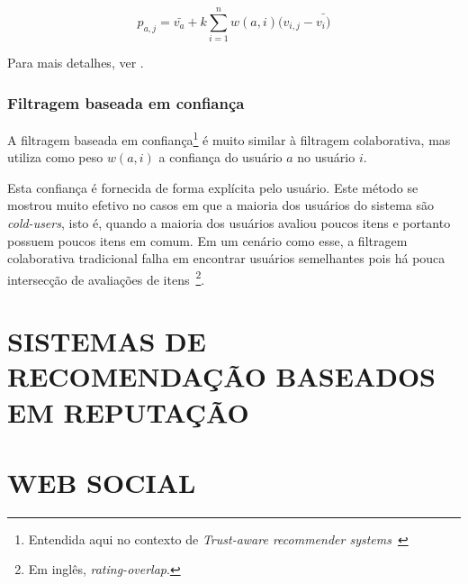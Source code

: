\begin{equation}
 p_{a,j} = \bar{v_{a}} + k\sum_{i=1}^n{w(a,i) (v_{i,j} - \bar{v_{i})}}
 \label{eq:filtragem_colaborativa_geral} 
\end{equation}

Para mais detalhes, ver \cite{Breese98}.


\subsubsection{Filtragem baseada em confiança} %

A filtragem baseada em confiança\footnote{Entendida aqui no contexto de \textit{Trust-aware recommender systems}~\cite{Massa07}} é muito similar à filtragem colaborativa, mas utiliza como peso $w(a,i)$ a confiança do usuário $a$ no usuário $i$.

Esta confiança é fornecida de forma explícita pelo usuário. Este método se mostrou muito efetivo no casos em que a maioria dos usuários do sistema são \textit{cold-users}, isto é, quando a maioria dos usuários avaliou poucos itens e portanto possuem poucos itens em comum. Em um cenário como esse, a filtragem colaborativa tradicional falha em encontrar usuários semelhantes pois há pouca intersecção de avaliações de itens~\footnote{Em inglês, \textit{rating-overlap}.}.



\section{SISTEMAS DE RECOMENDAÇÃO BASEADOS EM REPUTAÇÃO}
\label{sec:sistemas_de_recomendacao_baseados_em_reputacao}


\section{WEB SOCIAL} %


